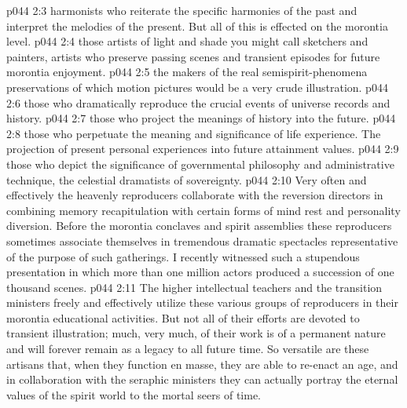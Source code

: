 \pc \vs p044 2:3 \bibnobreakspace {}harmonists who reiterate the specific harmonies of the past and interpret the melodies of the present. But all of this is effected on the morontia level.
\pc \vs p044 2:4 \bibnobreakspace {}those artists of light and shade you might call sketchers and painters, artists who preserve passing scenes and transient episodes for future morontia enjoyment.
\pc \vs p044 2:5 \bibnobreakspace {}the makers of the real semispirit\hyp{}phenomena preservations of which motion pictures would be a very crude illustration.
\pc \vs p044 2:6 \bibnobreakspace {}those who dramatically reproduce the crucial events of universe records and history.
\pc \vs p044 2:7 \bibnobreakspace {}those who project the meanings of history into the future.
\pc \vs p044 2:8 \bibnobreakspace {}those who perpetuate the meaning and significance of life experience. The projection of present personal experiences into future attainment values.
\pc \vs p044 2:9 \bibnobreakspace {}those who depict the significance of governmental philosophy and administrative technique, the celestial dramatists of sovereignty.
\pc \vs p044 2:10 Very often and effectively the heavenly reproducers collaborate with the reversion directors in combining memory recapitulation with certain forms of mind rest and personality diversion. Before the morontia conclaves and spirit assemblies these reproducers sometimes associate themselves in tremendous dramatic spectacles representative of the purpose of such gatherings. I recently witnessed such a stupendous presentation in which more than one million actors produced a succession of one thousand scenes.
\vs p044 2:11 The higher intellectual teachers and the transition ministers freely and effectively utilize these various groups of reproducers in their morontia educational activities. But not all of their efforts are devoted to transient illustration; much, very much, of their work is of a permanent nature and will forever remain as a legacy to all future time. So versatile are these artisans that, when they function en masse, they are able to re\hyp{}enact an age, and in collaboration with the seraphic ministers they can actually portray the eternal values of the spirit world to the mortal seers of time.
